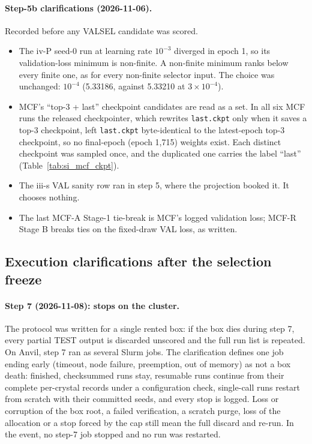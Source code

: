 \paragraph{Step-5b clarifications (2026-11-06).} Recorded before any VALSEL
candidate was scored.
\begin{itemize}
\item The iv-P seed-0 run at learning rate $10^{-3}$ diverged in epoch 1, so its
validation-loss minimum is non-finite. A non-finite minimum ranks below every
finite one, as for every non-finite selector input. The choice was unchanged:
$10^{-4}$ (5.33186, against 5.33210 at $3\times10^{-4}$).
\item MCF's ``top-3 + last'' checkpoint candidates are read as a set. In all six
MCF runs the released checkpointer, which rewrites \texttt{last.ckpt} only when it
saves a top-3 checkpoint, left \texttt{last.ckpt} byte-identical to the
latest-epoch top-3 checkpoint, so no final-epoch (epoch 1,715) weights exist. Each
distinct checkpoint was sampled once, and the duplicated one carries the label
``last'' (Table~\ref{tab:si_mcf_ckpt}).
\item The iii-s VAL sanity row ran in step 5, where the projection booked it. It
chooses nothing.
\item The last MCF-A Stage-1 tie-break is MCF's logged validation loss; MCF-R
Stage B breaks ties on the fixed-draw VAL loss, as written.
\end{itemize}

\subsection{Execution clarifications after the selection freeze}\label{si:clarifications}

\paragraph{Step 7 (2026-11-08): stops on the cluster.} The protocol was written for
a single rented box: if the box dies during step 7, every partial TEST output is
discarded unscored and the full run list is repeated. On Anvil, step 7 ran as
several Slurm jobs. The clarification defines one job ending early (timeout, node
failure, preemption, out of memory) as not a box death: finished, checksummed runs
stay, resumable runs continue from their complete per-crystal records under a
configuration check, single-call runs restart from scratch with their committed
seeds, and every stop is logged. Loss or corruption of the box root, a failed
verification, a scratch purge, loss of the allocation or a stop forced by the cap
still mean the full discard and re-run. In the event, no step-7 job stopped and no
run was restarted.

